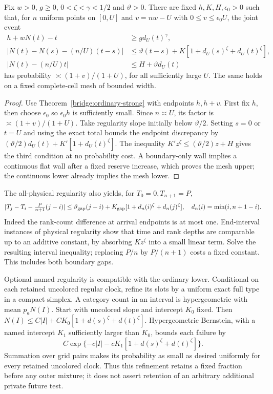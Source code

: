 \begin{corollary}
\label{bridge:ordinary-surplus}
Fix $w>0$, $g\ge0$, $0<\zeta<\gamma<1/2$ and $\vartheta>0$.
There are fixed $h,K,H,\epsilon_0>0$ such that, for $n$ uniform
points on $[0,U]$ and $v=nw-U$ with $0\le v\le\epsilon_0U$,
the joint event
\begin{align*}
 h+wN(t)-t&\ge gd_U(t)^\gamma,\\
 |N(t)-N(s)-(n/U)(t-s)|
 &\le\vartheta(t-s)+K[1+d_U(s)^\zeta+d_U(t)^\zeta],\\
 |N(t)-(n/U)t|&\le H+\vartheta d_U(t)
\end{align*}
has probability $\asymp(1+v)/(1+U)$, for all sufficiently large $U$.
The same holds on a fixed complete-cell mesh of bounded width.
\end{corollary}
\begin{proof}
Use Theorem~\ref{bridge:ordinary-strong} with endpoints $h,h+v$.
First fix $h$, then choose $\epsilon_0$ so $\epsilon_0h$ is
sufficiently small. Since $n\asymp U$, its factor is
$\asymp(1+v)/(1+U)$. Take regularity slope initially below
$\vartheta/2$. Setting $s=0$ or $t=U$ and using the exact total
bounds the endpoint discrepancy by
$(\vartheta/2)d_U(t)+K'[1+d_U(t)^\zeta]$.
The inequality $K'z^\zeta\le(\vartheta/2)z+H$ gives the third
condition at no probability cost. A boundary-only wall implies
a continuous flat wall after a fixed reserve increase, which proves
the mesh upper; the continuous lower already implies the mesh lower.
\end{proof}

The all-physical regularity also yields, for $T_0=0,T_{n+1}=P$,
\[
 |T_j-T_i-\tfrac P{n+1}(j-i)|
 \le\vartheta_{\rm gap}(j-i)
       +K_{\rm gap}[1+d_n(i)^\zeta+d_n(j)^\zeta],
 \quad d_n(i)=\min(i,n+1-i).
\]
Indeed the rank-count difference at arrival endpoints is at most one.
End-interval instances of physical regularity show that time and rank
depths are comparable up to an additive constant, by absorbing
$Kz^\zeta$ into a small linear term. Solve the resulting interval
inequality; replacing $P/n$ by $P/(n+1)$ costs a fixed constant.
This includes both boundary gaps.

Optional named regularity is compatible with the ordinary lower.
Conditional on each retained uncolored regular clock, refine its slots
by a uniform exact full type in a compact simplex. A category count
in an interval is hypergeometric with mean $p_aN(I)$. Start with
uncolored slope and intercept $K_0$ fixed. Then
$N(I)\le C|I|+CK_0[1+d(s)^\zeta+d(t)^\zeta]$.
Hypergeometric Bernstein, with a named intercept $K_1$ sufficiently
larger than $K_0$, bounds each failure by
\[
 C\exp\{-c|I|-cK_1[1+d(s)^\zeta+d(t)^\zeta]\}.
\]
Summation over grid pairs makes its probability as small as desired
uniformly for every retained uncolored clock. Thus this refinement
retains a fixed fraction before any outer mixture; it does not assert
retention of an arbitrary additional private future test.

